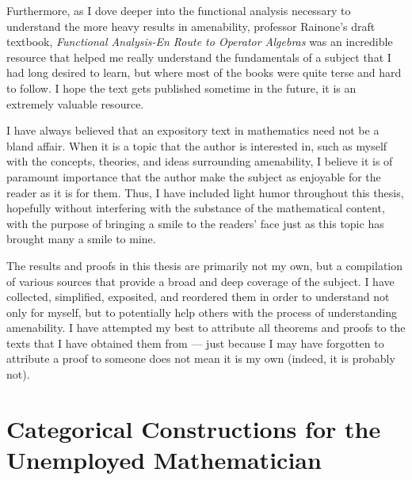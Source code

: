 \documentclass[11pt]{package2}
\begin{document}
Furthermore, as I dove deeper into the functional analysis necessary to understand the more heavy results in amenability, professor Rainone's draft textbook, \textit{Functional Analysis-En Route to Operator Algebras} was an incredible resource that helped me really understand the fundamentals of a subject that I had long desired to learn, but where most of the books were quite terse and hard to follow. I hope the text gets published sometime in the future, it is an extremely valuable resource.\newline

I have always believed that an expository text in mathematics need not be a bland affair. When it is a topic that the author is interested in, such as myself with the concepts, theories, and ideas surrounding amenability, I believe it is of paramount importance that the author make the subject as enjoyable for the reader as it is for them. Thus, I have included light humor throughout this thesis, hopefully without interfering with the substance of the mathematical content, with the purpose of bringing a smile to the readers' face just as this topic has brought many a smile to mine.\newline

The results and proofs in this thesis are primarily not my own, but a compilation of various sources that provide a broad and deep coverage of the subject. I have collected, simplified, exposited, and reordered them in order to understand not only for myself, but to potentially help others with the process of understanding amenability. I have attempted my best to attribute all theorems and proofs to the texts that I have obtained them from --- just because I may have forgotten to attribute a proof to someone does not mean it is my own (indeed, it is probably not).
\chapter{Categorical Constructions for the Unemployed Mathematician}\label{ch:categorical_constructions}

\end{document}
